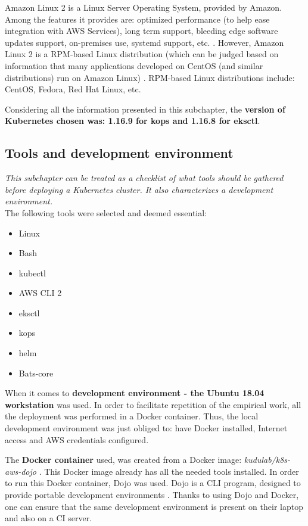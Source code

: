 Amazon Linux 2 is a Linux Server Operating System, provided by Amazon. Among the features it provides are: optimized performance (to help ease integration with AWS Services), long term support, bleeding edge software updates support, on-premises use, systemd support, etc. \cite{al2}. However, Amazon Linux 2 is a RPM-based Linux distribution (which can be judged based on information that many applications developed on CentOS (and similar distributions) run on Amazon Linux) \cite{al2-centos}. RPM-based Linux distributions include: CentOS, Fedora, Red Hat Linux, etc.

Considering all the information presented in this subchapter, the \textbf{version of Kubernetes chosen was: 1.16.9 for kops and 1.16.8 for eksctl}.


\subsection{Tools and development environment}
\label{tools}
\textit{This subchapter can be treated as a checklist of what tools should be gathered before deploying a Kubernetes cluster. It also characterizes a development environment.}
\\

The following tools were selected and deemed essential:
\begin{itemize}
\item Linux
\item Bash
\item kubectl
\item AWS CLI 2
\item eksctl
\item kops
\item helm
\item Bats-core
\end{itemize}

When it comes to \textbf{development environment - the Ubuntu 18.04 workstation} was used. In order to facilitate repetition of the empirical work, all the deployment was performed in a Docker container. Thus, the local development environment was just obliged to: have Docker installed, Internet access and AWS credentials configured.

The \textbf{Docker container} used, was created from a Docker image: \textit{kudulab/k8s-aws-dojo} \cite{gh-k8s-aws-dojo}. This Docker image already has all the needed tools installed. In order to run this Docker container, Dojo was used. Dojo is a CLI program, designed to provide portable development environments \cite{gh-dojo}. Thanks to using Dojo and Docker, one can ensure that the same development environment is present on their laptop and also on a CI server.

